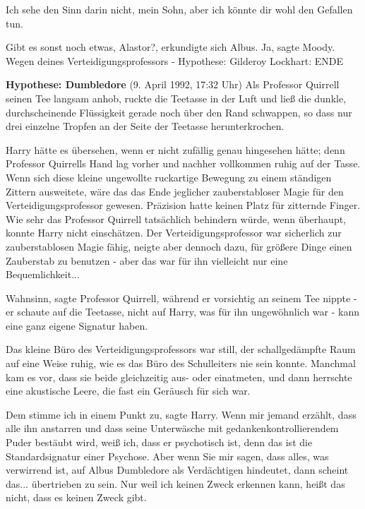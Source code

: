 \glqq{}Ich sehe den Sinn darin nicht, mein Sohn, aber ich könnte dir wohl den
Gefallen tun.\grqq{}

\glqq{}Gibt es sonst noch etwas, Alastor?\grqq{}, erkundigte sich Albus. \glqq{}
Ja\grqq{}, sagte Moody. \glqq{}Wegen deines Verteidigungsprofessors -\grqq{}
Hypothese: Gilderoy Lockhart: ENDE

\textbf{Hypothese: Dumbledore} (9. April 1992, 17:32 Uhr) Als Professor Quirrell
seinen Tee langsam anhob, ruckte die Teetasse in der Luft und ließ die dunkle,
durchscheinende Flüssigkeit gerade noch über den Rand schwappen, so dass nur
drei einzelne Tropfen an der Seite der Teetasse herunterkrochen.

Harry hätte es übersehen, wenn er nicht zufällig genau hingesehen hätte; denn
Professor Quirrells Hand lag vorher und nachher vollkommen ruhig auf der Tasse.
Wenn sich diese kleine ungewollte ruckartige Bewegung zu einem ständigen Zittern
ausweitete, wäre das das Ende jeglicher zauberstabloser Magie für den
Verteidigungsprofessor gewesen. Präzision hatte keinen Platz für zitternde
Finger. Wie sehr das Professor Quirrell tatsächlich behindern würde, wenn
überhaupt, konnte Harry nicht einschätzen. Der Verteidigungsprofessor war
sicherlich zur zauberstablosen Magie fähig, neigte aber dennoch dazu, für
größere Dinge einen Zauberstab zu benutzen - aber das war für ihn vielleicht nur
eine Bequemlichkeit...

\glqq{}Wahnsinn\grqq{}, sagte Professor Quirrell, während er vorsichtig an seinem
Tee nippte - er schaute auf die Teetasse, nicht auf Harry, was für ihn
ungewöhnlich war - \glqq{}kann eine ganz eigene Signatur haben.\grqq{}

Das kleine Büro des Verteidigungsprofessors war still, der schallgedämpfte Raum
auf eine Weise ruhig, wie es das Büro des Schulleiters nie sein konnte. Manchmal
kam es vor, dass sie beide gleichzeitig aus- oder einatmeten, und dann herrschte
eine akustische Leere, die fast ein Geräusch für sich war.

\glqq{}Dem stimme ich in einem Punkt zu\grqq{}, sagte Harry. \glqq{}Wenn mir
jemand erzählt, dass alle ihn anstarren und dass seine Unterwäsche mit
gedankenkontrollierendem Puder bestäubt wird, weiß ich, dass er psychotisch ist,
denn das ist die Standardsignatur einer Psychose. Aber wenn Sie mir sagen, dass
alles, was verwirrend ist, auf Albus Dumbledore als Verdächtigen hindeutet, dann
scheint das... übertrieben zu sein. Nur weil ich keinen Zweck erkennen kann,
heißt das nicht, dass es keinen Zweck gibt.\grqq{}

